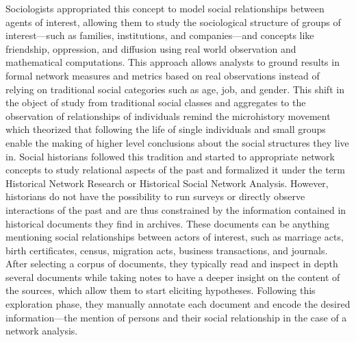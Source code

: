 Sociologists appropriated this concept to model social relationships between agents of interest, allowing them to study the sociological structure of groups of interest---such as families, institutions, and companies---and concepts like friendship, oppression, and diffusion using real world observation and mathematical computations.
This \sna approach allows analysts to ground results in formal network measures and metrics based on real observations instead of relying on traditional social categories such as age, job, and gender\cite{freemanDevelopmentSocialNetwork2004}.
This shift in the object of study from traditional social classes and aggregates to the observation of relationships of individuals remind the microhistory movement\cite{ginzburgMicrohistoire1981} which theorized that following the life of single individuals and small groups enable the making of higher level conclusions about the social structures they live in.
Social historians followed this tradition and started to appropriate network concepts to study relational aspects of the past and formalized it under the term Historical Network Research or Historical Social Network Analysis\cite{wetherellHistoricalSocialNetwork1998}.
However, historians do not have the possibility to run surveys or directly observe interactions of the past and are thus constrained by the information contained in historical documents they find in archives.
These documents can be anything mentioning social relationships between actors of interest, such as marriage acts, birth certificates, census, migration acts, business transactions, and journals.
After selecting a corpus of documents, they typically read and inspect in depth several documents while taking notes to have a deeper insight on the content of the sources, which allow them to start eliciting hypotheses.
Following this exploration phase, they manually annotate each document and encode the desired information---the mention of persons and their social relationship in the case of a network analysis.
